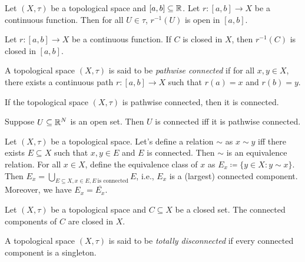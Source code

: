 \documentclass{techreport}
\begin{document}
\begin{lemma}\label{Lem:ContinuousReverseOpenIsOpen}
	Let $(X,\tau)$ be a topological space and $[a,b] \subseteq \mathbb{R}$.
	Let $r : [a,b] \to X$ be a continuous function.
	Then for all $U \in \tau$, $r^{-1}(U)$ is open in $[a,b]$.
\end{lemma}

\begin{remark}\label{Lem:ContinuousReverseClosedIsClosed}
	Let $r : [a,b] \to X$ be a continuous function.
	If $C$ is closed in $X$, then $r^{-1}(C)$ is closed in $[a,b]$.
\end{remark}

\begin{definition}\label{De:PathwiseConnected}
	A topological space $(X,\tau)$ is said to be \emph{pathwise connected} if for all $x,y \in X$, there exists a continuous path $r : [a,b] \to X$ such that $r(a) =x$ and $r(b)=y$.
\end{definition}

\begin{proposition}\label{Prop:PathWiseConnImplyConn}
	If the topological space $(X,\tau)$ is pathwise connected, then it is connected.
\end{proposition}

\begin{proposition}\label{Prop:OpenSetInEuclideanSpaceConn}
	Suppose $U \subseteq \mathbb{R}^N$ is an open set.
	Then $U$ is connected iff it is pathwise connected.
\end{proposition}

\begin{definition}\label{De:ConnEquivalenceRelation}
	Let $(X,\tau)$ be a topological space.
	Let's define a relation ${\sim}$ as $x \sim y$ iff there exists $E \subseteq X$ such that $x,y\in E$ and $E$ is connected.
	Then ${\sim}$ is an equivalence relation.
	For all $x \in X$, define the equivalence class of $x$ as $E_x \coloneqq \{ y \in X : y \sim x \}$.
	Then $E_x = \bigcup_{E \subseteq X, x \in E, E~\text{is connected}} E$, i.e., $E_x$ is a (largest) connected component.
	Moreover, we have $E_x = \overline{E_x}$.
\end{definition}

\begin{proposition}\label{Prop:ClosedConnComponentStillClosed}
	Let $(X,\tau)$ be a topological space and $C \subseteq X$ be a closed set.
	The connected components of $C$ are closed in $X$.
\end{proposition}

\begin{definition}\label{De:TotalDisconnectedness}
	A topological space $(X,\tau)$ is said to be \emph{totally disconnected} if every connected component is a singleton.
\end{definition}
\end{document}
